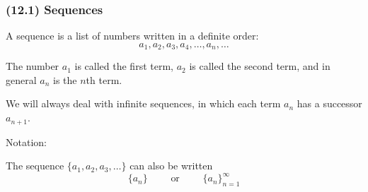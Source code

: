 \begin{frame}
\frametitle{(12.1)  Sequences}
\begin{definition}[Sequence]
A sequence is a list of numbers written in a definite order:
\[
a_1, a_2, a_3, a_4, \ldots , a_n , \ldots
\]

The number $a_1$ is called the first term, $a_2$ is called the second term, and in general $a_n$ is the $n$th term.

We will always deal with infinite sequences, in which each term $a_n$ has a successor $a_{n+1}$.
\end{definition}

Notation:

The sequence $\{ a_1, a_2, a_3, \ldots \}$ can also be written
\[
\{ a_n\} \qquad \textrm{ or }\qquad \{ a_n\}_{n = 1}^\infty
\]
\end{frame}
